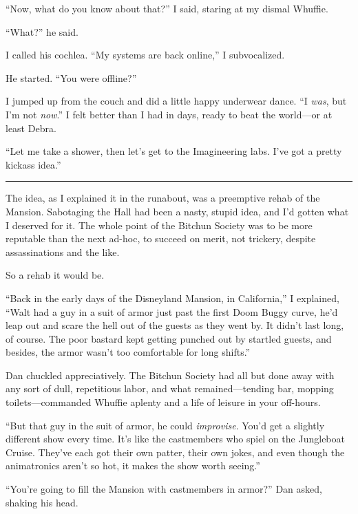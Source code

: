 “Now, what do you know about that?” I said, staring at my dismal
Whuffie.

“What?” he said.

I called his cochlea. “My systems are back online,” I
subvocalized.

He started. “You were offline?”

I jumped up from the couch and did a little happy underwear dance.
“I \emph{was}, but I'm not \emph{now}.” I felt better than I had in
days, ready to beat the world—or at least Debra.

“Let me take a shower, then let's get to the Imagineering labs.
I've got a pretty kickass idea.”

\begin{center}\rule{3in}{0.4pt}\end{center}

The idea, as I explained it in the runabout, was a preemptive rehab
of the Mansion. Sabotaging the Hall had been a nasty, stupid idea,
and I'd gotten what I deserved for it. The whole point of the
Bitchun Society was to be more reputable than the next ad-hoc, to
succeed on merit, not trickery, despite assassinations and the
like.

So a rehab it would be.

“Back in the early days of the Disneyland Mansion, in California,”
I explained, “Walt had a guy in a suit of armor just past the first
Doom Buggy curve, he'd leap out and scare the hell out of the
guests as they went by. It didn't last long, of course. The poor
bastard kept getting punched out by startled guests, and besides,
the armor wasn't too comfortable for long shifts.”

Dan chuckled appreciatively. The Bitchun Society had all but done
away with any sort of dull, repetitious labor, and what
remained—tending bar, mopping toilets—commanded Whuffie aplenty and
a life of leisure in your off-hours.

“But that guy in the suit of armor, he could \emph{improvise}.
You'd get a slightly different show every time. It's like the
castmembers who spiel on the Jungleboat Cruise. They've each got
their own patter, their own jokes, and even though the animatronics
aren't so hot, it makes the show worth seeing.”

“You're going to fill the Mansion with castmembers in armor?” Dan
asked, shaking his head.

